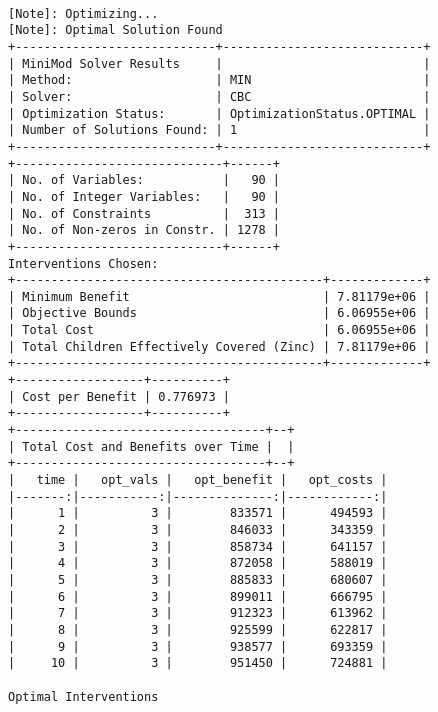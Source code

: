 \documentclass[
]{article}
\begin{document}
\begin{verbatim}
                
[Note]: Optimizing...
[Note]: Optimal Solution Found
+----------------------------+----------------------------+
| MiniMod Solver Results     |                            |
| Method:                    | MIN                        |
| Solver:                    | CBC                        |
| Optimization Status:       | OptimizationStatus.OPTIMAL |
| Number of Solutions Found: | 1                          |
+----------------------------+----------------------------+
+-----------------------------+------+
| No. of Variables:           |   90 |
| No. of Integer Variables:   |   90 |
| No. of Constraints          |  313 |
| No. of Non-zeros in Constr. | 1278 |
+-----------------------------+------+
Interventions Chosen:
+-------------------------------------------+-------------+
| Minimum Benefit                           | 7.81179e+06 |
| Objective Bounds                          | 6.06955e+06 |
| Total Cost                                | 6.06955e+06 |
| Total Children Effectively Covered (Zinc) | 7.81179e+06 |
+-------------------------------------------+-------------+
+------------------+----------+
| Cost per Benefit | 0.776973 |
+------------------+----------+
+-----------------------------------+--+
| Total Cost and Benefits over Time |  |
+-----------------------------------+--+
|   time |   opt_vals |   opt_benefit |   opt_costs |
|-------:|-----------:|--------------:|------------:|
|      1 |          3 |        833571 |      494593 |
|      2 |          3 |        846033 |      343359 |
|      3 |          3 |        858734 |      641157 |
|      4 |          3 |        872058 |      588019 |
|      5 |          3 |        885833 |      680607 |
|      6 |          3 |        899011 |      666795 |
|      7 |          3 |        912323 |      613962 |
|      8 |          3 |        925599 |      622817 |
|      9 |          3 |        938577 |      693359 |
|     10 |          3 |        951450 |      724881 |

Optimal Interventions


\end{verbatim}
\end{document}
